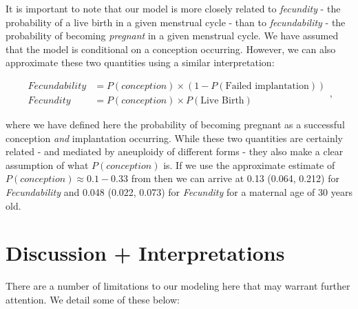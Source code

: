\documentclass{article}
\begin{document}
It is important to note that our model is more closely related to \textit{fecundity} - the probability of a live birth in a given menstrual cycle - than to \textit{fecundability} - the probability of becoming \textit{pregnant} in a given menstrual cycle. We have assumed that the model is conditional on a conception occurring. However, we can also approximate these two quantities using a similar interpretation: 

\begin{equation}
\begin{aligned}
Fecundability &= P(conception)\times (1 - P(\text{Failed implantation}))\\
Fecundity &= P(conception)\times P(\text{Live Birth})
\end{aligned},
\end{equation}

where we have defined here the probability of becoming pregnant as a successful conception \textit{and} implantation occurring. While these two quantities are certainly related - and mediated by aneuploidy of different forms - they also make a clear assumption of what $P(conception)$ is. If we use the approximate estimate of $P(conception) \approx 0.1 - 0.33$ from \citep{Wilcox1995-hs} then we can arrive at  0.13 (0.064, 0.212) for \textit{Fecundability} and 0.048 (0.022, 0.073) for \textit{Fecundity} for a maternal age of 30 years old.

\section*{Discussion + Interpretations}

There are a number of limitations to our modeling here that may warrant further attention. We detail some of these below: 
\end{document}
